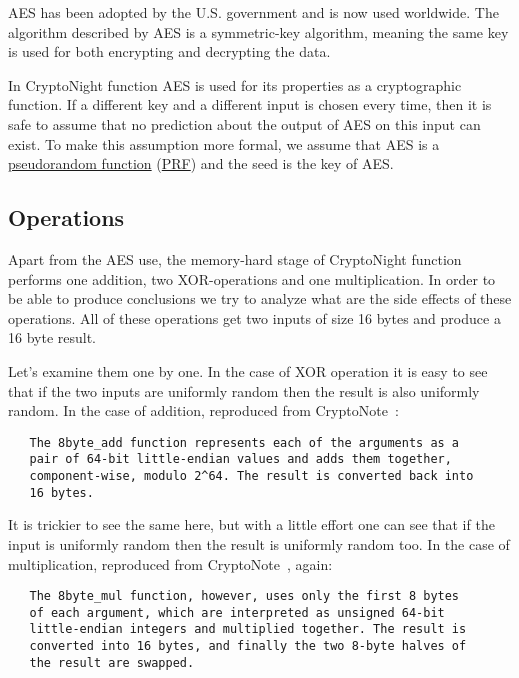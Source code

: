 AES has been adopted by the U.S. government and is now used worldwide. The algorithm described by AES is a symmetric-key algorithm, meaning the same key is used for both encrypting and decrypting the data.

In CryptoNight function AES is used for its properties as a cryptographic function. If a different key and a different input is chosen every time, then it is safe to assume that no prediction about the output of AES on this input can exist. To make this assumption more formal, we assume that AES is a \hyperref[sec:PRF]{pseudorandom function} (\hyperref[sec:PRF]{PRF}) and the seed is the key of AES.


\subsection{Operations}
Apart from the AES use, the memory-hard stage of CryptoNight function performs one addition, two XOR-operations and one multiplication. In order to be able to produce conclusions we try to analyze what are the side effects of these operations. All of these operations get two inputs of size 16 bytes and produce a 16 byte result.

Let's examine them one by one. In the case of XOR operation it is easy to see that if the two inputs are uniformly random then the result is also uniformly random. In the case of addition, reproduced from CryptoNote~\cite{cryptonight}:
\begin{verbatim}
   The 8byte_add function represents each of the arguments as a
   pair of 64-bit little-endian values and adds them together,
   component-wise, modulo 2^64. The result is converted back into
   16 bytes.
\end{verbatim}
It is trickier to see the same here, but with a little effort one can see that if the input is uniformly random then the result is uniformly random too. In the case of multiplication, reproduced from CryptoNote~\cite{cryptonight}, again:
\begin{verbatim}
   The 8byte_mul function, however, uses only the first 8 bytes
   of each argument, which are interpreted as unsigned 64-bit
   little-endian integers and multiplied together. The result is
   converted into 16 bytes, and finally the two 8-byte halves of
   the result are swapped.
\end{verbatim}


